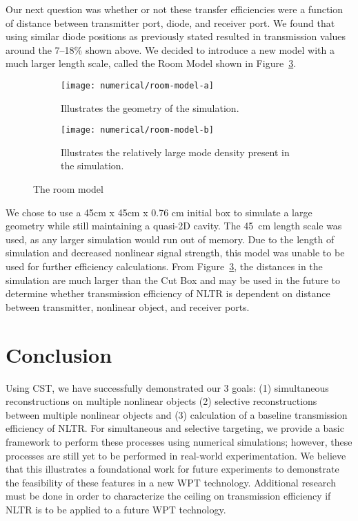 Our next question was whether or not these transfer efficiencies were a function of distance between transmitter port, diode, and receiver port. We found that using similar diode positions as previously stated resulted in transmission values around the \numrange{7}{18}\% shown above. We decided to introduce a new model with a much larger length scale, called the Room Model shown in Figure~\ref{fig:numerical-room-model}.

\begin{figure}[t]
\centering
\begin{subfigure}{.4\textwidth}
\centering
\texttt{[image: numerical/room-model-a]}
\caption[Geometry of the Room Model]{Illustrates the geometry of the simulation.}
\label{fig:numerical-room-model-a}
\end{subfigure}
\begin{subfigure}{.4\textwidth}
\centering
\texttt{[image: numerical/room-model-b]}
\caption[Mode density of the Room Model]{Illustrates the relatively large mode density present in the simulation.}
\label{fig:numerical-room-model-b}
\end{subfigure}
\caption[The Room Model]{The room model}
\label{fig:numerical-room-model}
\end{figure}


We chose to use a 45cm x 45cm x 0.76 cm initial box to simulate a large geometry while still maintaining a quasi-2D cavity. The 45~cm length scale was used, as any larger simulation would run out of memory.  Due to the length of simulation and decreased nonlinear signal strength, this model was unable to be used for further efficiency calculations. From Figure~\ref{fig:numerical-room-model}, the distances in the simulation are much larger than the Cut Box and may be used in the future to determine whether transmission efficiency of NLTR is dependent on distance between transmitter, nonlinear object, and receiver ports.

\section{Conclusion}
\label{sec:numerical-conclusion}

Using CST, we have successfully demonstrated our 3 goals: (1) simultaneous reconstructions on multiple nonlinear objects (2) selective reconstructions between multiple nonlinear objects and (3) calculation of a baseline transmission efficiency of NLTR. For simultaneous and selective targeting, we provide a basic framework to perform these processes using numerical simulations; however, these processes are still yet to be performed in real-world experimentation. We believe that this illustrates a foundational work for future experiments to demonstrate the feasibility of these features in a new WPT technology. Additional research must be done in order to characterize the ceiling on transmission efficiency if NLTR is to be applied to a future WPT technology.